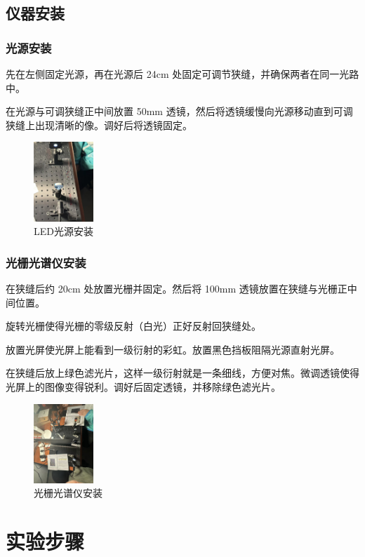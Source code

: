 \documentclass{ctexart}
\begin{document}
\subsection{仪器安装}
\subsubsection{光源安装}
先在左侧固定光源，再在光源后 24cm 处固定可调节狭缝，并确保两者在同一光路中。

在光源与可调狭缝正中间放置 50mm 透镜，然后将透镜缓慢向光源移动直到可调狭缝上出现清晰的像。调好后将透镜固定。
\begin{figure}[htbp]
    \centering
    \includegraphics[width=0.2\textwidth,height=0.3\textwidth]{pictures/微信图片_20241107162037.jpg}
    \caption{LED光源安装}
\end{figure}
\subsubsection{光栅光谱仪安装}
在狭缝后约 20cm 处放置光栅并固定。然后将 100mm 透镜放置在狭缝与光栅正中间位置。

旋转光栅使得光栅的零级反射（白光）正好反射回狭缝处。

放置光屏使光屏上能看到一级衍射的彩虹。放置黑色挡板阻隔光源直射光屏。

在狭缝后放上绿色滤光片，这样一级衍射就是一条细线，方便对焦。微调透镜使得光屏上的图像变得锐利。调好后固定透镜，并移除绿色滤光片。
\begin{figure}[htbp]
    \centering
    \includegraphics[width=0.2\textwidth,height=0.3\textwidth]{pictures/微信图片_20241107162049.jpg}
    \caption{光栅光谱仪安装}
\end{figure}
\section{实验步骤}
\end{document}
